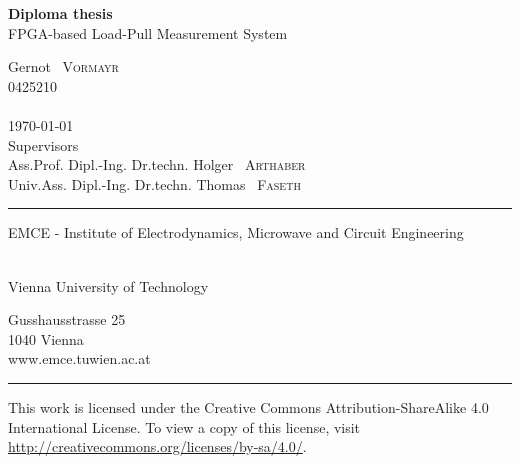\documentclass[12pt,a4paper,parskip=full,abstract=true,BCOR=12mm,twoside,open=right]{scrreprt}
\begin{document}
\begin{titlepage}
    \enlargethispage{1cm}
    \centering
    \vspace*{5cm}
    {\Huge \textbf{Diploma thesis}}\\
    \vspace*{1cm}
    {\Large FPGA-based Load-Pull Measurement System}

    \vspace*{2cm}
    {\large Gernot ~\textsc{Vormayr} \\ 0425210 \\ } ~\\

    \vspace*{2cm}
    {\today } ~\\

    \vfill
    {Supervisors} ~\\\vspace*{0.1cm}
    {Ass.Prof. Dipl.-Ing. Dr.techn. \large Holger ~\textsc{Arthaber}} ~\\
    {Univ.Ass. Dipl.-Ing. Dr.techn. \large Thomas ~\textsc{Faseth}}
    \vspace*{2cm}

    \rule{\linewidth}{0.4pt}
    \begin{minipage}[t]{0.60\linewidth}
        \flushleft
        \begin{large}
            EMCE - Institute of Electrodynamics, Microwave and Circuit Engineering
        \end{large}\\
        Vienna University of Technology
    \end{minipage}
    \hfill
    \begin{minipage}[t]{0.30\linewidth}
        \flushright
        Gusshausstrasse 25\\
        1040 Vienna\\
        www.emce.tuwien.ac.at
    \end{minipage}
    \vspace*{-3pt}
    \rule{\linewidth}{0.4pt}
    \clearpage
\end{titlepage}

\thispagestyle{empty}
\vspace*{\fill}
\begin{center}
\begin{minipage}{.3\textwidth}
    \doclicenseImage
\end{minipage}
\begin{minipage}{.6\textwidth}
    This work is licensed under the Creative Commons Attribution-ShareAlike 4.0 International License.
    To view a copy of this license, visit \url{http://creativecommons.org/licenses/by-sa/4.0/}.
\end{minipage}
\end{center}
\end{document}
